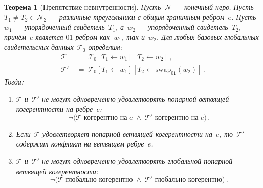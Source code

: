 \documentclass[11pt,a4paper]{article}
\theoremstyle{plain}
\newtheorem{theorem}{Теорема}[section]
\theoremstyle{definition}
\theoremstyle{remark}
\newcommand{\cN}{\mathcal{N}}
\newcommand{\cT}{\mathcal{T}}
\newcommand{\swapAB}{\mathrm{swap}_{01}}
\begin{document}
\begin{theorem}[Препятствие невнутренности]
\label{thm:main-obstruction}
Пусть~$\cN$ --- конечный нерв. Пусть~$T_1 \neq T_2 \in \cN_2$ ---
различные треугольники с общим граничным ребром~$e$. Пусть~$w_1$ ---
упорядоченный свидетель~$T_1$, а~$w_2$ --- упорядоченный свидетель~$T_2$,
причём~$e$ является $01$-ребром как~$w_1$, так и~$w_2$. Для любых
базовых глобальных свидетельских данных~$\cT_0$ определим:
\begin{align}
  \cT &\;=\; \cT_0[T_1 \leftarrow w_1][T_2 \leftarrow w_2]\,,
  \label{eq:tau} \\
  \cT' &\;=\; \cT_0[T_1 \leftarrow w_1][T_2 \leftarrow \swapAB(w_2)]\,.
  \label{eq:tau-swap}
\end{align}
Тогда:
\begin{enumerate}[label=\textup{(\alph*)},nosep]
  \item\label{item:not-both}
    $\cT$ и~$\cT'$ не могут одновременно удовлетворять попарной ветвящей
    когерентности на ребре~$e$:
    \[
      \neg\bigl(\text{$\cT$ когерентно на $e$}
      \;\wedge\;
      \text{$\cT'$ когерентно на $e$}\bigr)\,.
    \]
  \item\label{item:conditional}
    Если~$\cT$ удовлетворяет попарной ветвящей когерентности на~$e$,
    то~$\cT'$ содержит конфликт на ветвящем ребре~$e$.
  \item\label{item:global}
    $\cT$ и~$\cT'$ не могут одновременно удовлетворять \emph{глобальной}
    попарной ветвящей когерентности:
    \[
      \neg\bigl(\text{$\cT$ глобально когерентно}
      \;\wedge\;
      \text{$\cT'$ глобально когерентно}\bigr)\,.
    \]
\end{enumerate}
\end{theorem}
\end{document}
